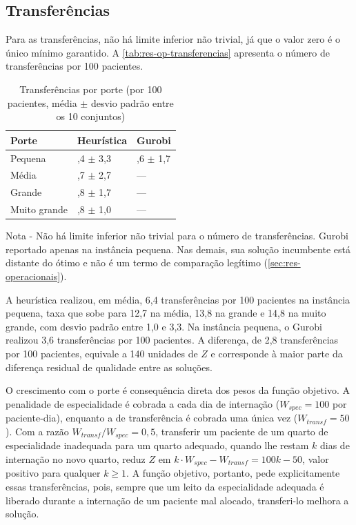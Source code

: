\subsection{Transferências}
\label{sec:res-op-transferencias}

Para as transferências, não há limite inferior não trivial, já que o valor zero é o único mínimo garantido. A \autoref{tab:res-op-transferencias} apresenta o número de transferências por 100 pacientes.

\begin{table}[H]
    \caption[Transferências por porte]{Transferências por porte (por 100 pacientes, média $\pm$ desvio padrão entre os 10 conjuntos)}
    \label{tab:res-op-transferencias}
    \centering
    \begin{adjustbox}{max width=\textwidth}
    \begin{tabular}{l*{2}{>{\centering\arraybackslash}p{3.0cm}}}
        \hline
        \textbf{Porte} & \textbf{Heurística} & \textbf{Gurobi} \\
        \hline
        Pequena & 6,4 $\pm$ 3,3 & 3,6 $\pm$ 1,7 \\
        Média & 12,7 $\pm$ 2,7 & --- \\
        Grande & 13,8 $\pm$ 1,7 & --- \\
        Muito grande & 14,8 $\pm$ 1,0 & --- \\
        \hline
    \end{tabular}
    \end{adjustbox}
    \par\smallskip
    {\footnotesize Nota - Não há limite inferior não trivial para o número de transferências. Gurobi reportado apenas na instância pequena. Nas demais, sua solução incumbente está distante do ótimo e não é um termo de comparação legítimo (\autoref{sec:res-operacionais}).}
\end{table}

A heurística realizou, em média, 6,4 transferências por 100 pacientes na instância pequena, taxa que sobe para 12,7 na média, 13,8 na grande e 14,8 na muito grande, com desvio padrão entre 1,0 e 3,3. Na instância pequena, o Gurobi realizou 3,6 transferências por 100 pacientes. A diferença, de 2,8 transferências por 100 pacientes, equivale a 140 unidades de $Z$ e corresponde à maior parte da diferença residual de qualidade entre as soluções.

O crescimento com o porte é consequência direta dos pesos da função objetivo. A penalidade de especialidade é cobrada a cada dia de internação ($W_{spec} = 100$ por paciente-dia), enquanto a de transferência é cobrada uma única vez ($W_{transf} = 50$). Com a razão $W_{transf}/W_{spec} = 0{,}5$, transferir um paciente de um quarto de especialidade inadequada para um quarto adequado, quando lhe restam $k$ dias de internação no novo quarto, reduz $Z$ em $k \cdot W_{spec} - W_{transf} = 100k - 50$, valor positivo para qualquer $k \geq 1$. A função objetivo, portanto, pede explicitamente essas transferências, pois, sempre que um leito da especialidade adequada é liberado durante a internação de um paciente mal alocado, transferi-lo melhora a solução.

